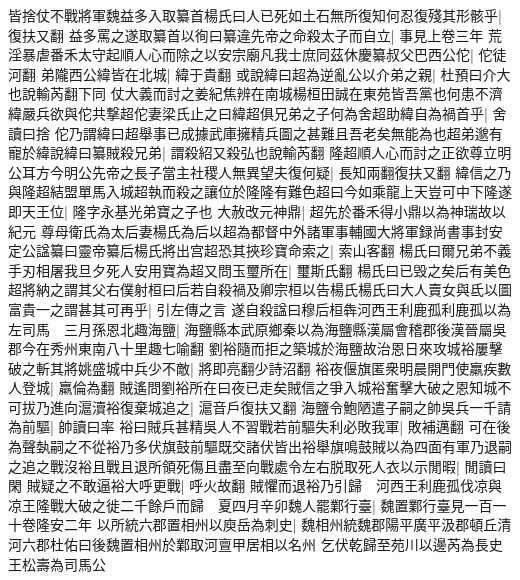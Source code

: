 皆捨仗不戰將軍魏益多入取纂首楊氏曰人已死如土石無所復知何忍復殘其形骸乎|{
	復扶又翻}
益多罵之遂取纂首以徇曰纂違先帝之命殺太子而自立|{
	事見上卷三年}
荒淫暴虐番禾太守起順人心而除之以安宗廟凡我士庶同茲休慶纂叔父巴西公佗|{
	佗徒河翻}
弟隴西公緯皆在北城|{
	緯于貴翻}
或說緯曰超為逆亂公以介弟之親|{
	杜預曰介大也說輸芮翻下同}
仗大義而討之姜紀焦辨在南城楊桓田誠在東苑皆吾黨也何患不濟緯嚴兵欲與佗共撃超佗妻梁氏止之曰緯超俱兄弟之子何為舍超助緯自為禍首乎|{
	舍讀曰捨}
佗乃謂緯曰超舉事已成據武庫擁精兵圖之甚難且吾老矣無能為也超弟邈有寵於緯說緯曰纂賊殺兄弟|{
	謂殺紹又殺弘也說輸芮翻}
隆超順人心而討之正欲尊立明公耳方今明公先帝之長子當主社稷人無異望夫復何疑|{
	長知兩翻復扶又翻}
緯信之乃與隆超結盟單馬入城超執而殺之讓位於隆隆有難色超曰今如乘龍上天豈可中下隆遂即天王位|{
	隆字永基光弟寶之子也}
大赦改元神鼎|{
	超先於番禾得小鼎以為神瑞故以紀元}
尊母衛氏為太后妻楊氏為后以超為都督中外諸軍事輔國大將軍録尚書事封安定公諡纂曰靈帝纂后楊氏將出宫超恐其挾珍寶命索之|{
	索山客翻}
楊氏曰爾兄弟不義手刃相屠我旦夕死人安用寶為超又問玉璽所在|{
	璽斯氏翻}
楊氏曰已毁之矣后有美色超將納之謂其父右僕射桓曰后若自殺禍及卿宗桓以告楊氏楊氏曰大人賣女與氐以圖富貴一之謂甚其可再乎|{
	引左傳之言}
遂自殺諡曰穆后桓犇河西王利鹿孤利鹿孤以為左司馬　三月孫恩北趣海鹽|{
	海鹽縣本武原鄉秦以為海鹽縣漢屬會稽郡後漢晉屬吳郡今在秀州東南八十里趣七喻翻}
劉裕隨而拒之築城於海鹽故治恩日來攻城裕屢擊破之斬其將姚盛城中兵少不敵|{
	將即亮翻少詩沼翻}
裕夜偃旗匿衆明晨開門使羸疾數人登城|{
	羸倫為翻}
賊遙問劉裕所在曰夜已走矣賊信之爭入城裕奮擊大破之恩知城不可拔乃進向滬瀆裕復棄城追之|{
	滬音戶復扶又翻}
海鹽令鮑陋遣子嗣之帥吳兵一千請為前驅|{
	帥讀曰率}
裕曰賊兵甚精吳人不習戰若前驅失利必敗我軍|{
	敗補邁翻}
可在後為聲埶嗣之不從裕乃多伏旗鼓前驅既交諸伏皆出裕舉旗鳴鼓賊以為四面有軍乃退嗣之追之戰沒裕且戰且退所領死傷且盡至向戰處令左右脱取死人衣以示閒暇|{
	閒讀曰閑}
賊疑之不敢逼裕大呼更戰|{
	呼火故翻}
賊懼而退裕乃引歸　河西王利鹿孤伐凉與凉王隆戰大破之徙二千餘戶而歸　夏四月辛卯魏人罷鄴行臺|{
	魏置鄴行臺見一百一十卷隆安二年}
以所統六郡置相州以庾岳為刺史|{
	魏相州統魏郡陽平廣平汲郡頓丘清河六郡杜佑曰後魏置相州於鄴取河亶甲居相以名州}
乞伏乾歸至苑川以邊芮為長史王松壽為司馬公

